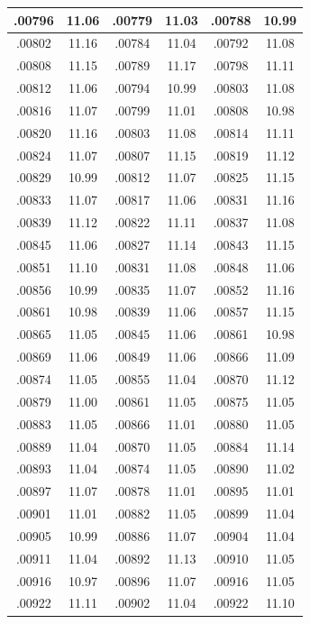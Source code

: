 \documentclass[10pt,twoside]{report}
\begin{document}
\begin{appendices}
\begin{longtable}{|c|c||c|c||c|c|}
.00796 & 11.06 & .00779 & 11.03 & .00788 & 10.99\\\hline
.00802 & 11.16 & .00784 & 11.04 & .00792 & 11.08\\\hline
.00808 & 11.15 & .00789 & 11.17 & .00798 & 11.11\\\hline
.00812 & 11.06 & .00794 & 10.99 & .00803 & 11.08\\\hline
.00816 & 11.07 & .00799 & 11.01 & .00808 & 10.98\\\hline
.00820 & 11.16 & .00803 & 11.08 & .00814 & 11.11\\\hline
.00824 & 11.07 & .00807 & 11.15 & .00819 & 11.12\\\hline
.00829 & 10.99 & .00812 & 11.07 & .00825 & 11.15\\\hline
.00833 & 11.07 & .00817 & 11.06 & .00831 & 11.16\\\hline
.00839 & 11.12 & .00822 & 11.11 & .00837 & 11.08\\\hline
.00845 & 11.06 & .00827 & 11.14 & .00843 & 11.15\\\hline
.00851 & 11.10 & .00831 & 11.08 & .00848 & 11.06\\\hline
.00856 & 10.99 & .00835 & 11.07 & .00852 & 11.16\\\hline
.00861 & 10.98 & .00839 & 11.06 & .00857 & 11.15\\\hline
.00865 & 11.05 & .00845 & 11.06 & .00861 & 10.98\\\hline
.00869 & 11.06 & .00849 & 11.06 & .00866 & 11.09\\\hline
.00874 & 11.05 & .00855 & 11.04 & .00870 & 11.12\\\hline
.00879 & 11.00 & .00861 & 11.05 & .00875 & 11.05\\\hline
.00883 & 11.05 & .00866 & 11.01 & .00880 & 11.05\\\hline
.00889 & 11.04 & .00870 & 11.05 & .00884 & 11.14\\\hline
.00893 & 11.04 & .00874 & 11.05 & .00890 & 11.02\\\hline
.00897 & 11.07 & .00878 & 11.01 & .00895 & 11.01\\\hline
.00901 & 11.01 & .00882 & 11.05 & .00899 & 11.04\\\hline
.00905 & 10.99 & .00886 & 11.07 & .00904 & 11.04\\\hline
.00911 & 11.04 & .00892 & 11.13 & .00910 & 11.05\\\hline
.00916 & 10.97 & .00896 & 11.07 & .00916 & 11.05\\\hline
.00922 & 11.11 & .00902 & 11.04 & .00922 & 11.10\\\hline

\end{longtable}
\end{appendices}
\end{document}
